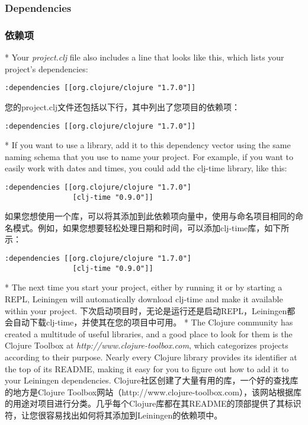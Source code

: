 \documentclass{book}
\begin{document}
\begin{paracol}{2}
\subsubsection{Dependencies}
\switchcolumn
\subsubsection{依赖项}
\switchcolumn[0]*
Your \emph{project.clj} file also includes a line that looks like this,
which lists your project's dependencies:
\begin{verbatim}
:dependencies [[org.clojure/clojure "1.7.0"]]
\end{verbatim}
\switchcolumn
您的project.clj文件还包括以下行，其中列出了您项目的依赖项：
\begin{verbatim}
:dependencies [[org.clojure/clojure "1.7.0"]]
\end{verbatim}
\switchcolumn[0]*
If you want to use a library, add it to this dependency vector using the
same naming schema that you use to name your project. For example, if
you want to easily work with dates and times, you could add the clj-time
library, like this:
\begin{verbatim}
:dependencies [[org.clojure/clojure "1.7.0"]
                [clj-time "0.9.0"]]
\end{verbatim}
\switchcolumn
如果您想使用一个库，可以将其添加到此依赖项向量中，使用与命名项目相同的命名模式。例如，如果您想要轻松处理日期和时间，可以添加clj-time库，如下所示：
\begin{verbatim}
:dependencies [[org.clojure/clojure "1.7.0"]
                [clj-time "0.9.0"]]
\end{verbatim}
\switchcolumn[0]*
The next time you start your project, either by running it or by
starting a REPL, Leiningen will automatically download clj-time and make
it available within your project.
\switchcolumn
下次启动项目时，无论是运行还是启动REPL，Leiningen都会自动下载clj-time，并使其在您的项目中可用。
\switchcolumn[0]*
The Clojure community has created a multitude of useful libraries, and a
good place to look for them is the Clojure Toolbox at
\emph{http://www.clojure-toolbox.com}, which categorizes projects
according to their purpose. Nearly every Clojure library provides its
identifier at the top of its README, making it easy for you to figure
out how to add it to your Leiningen dependencies.
\switchcolumn
Clojure社区创建了大量有用的库，一个好的查找库的地方是Clojure Toolbox网站（http://www.clojure-toolbox.com），该网站根据库的用途对项目进行分类。几乎每个Clojure库都在其README的顶部提供了其标识符，让您很容易找出如何将其添加到Leiningen的依赖项中。

\end{paracol}
\end{document}
